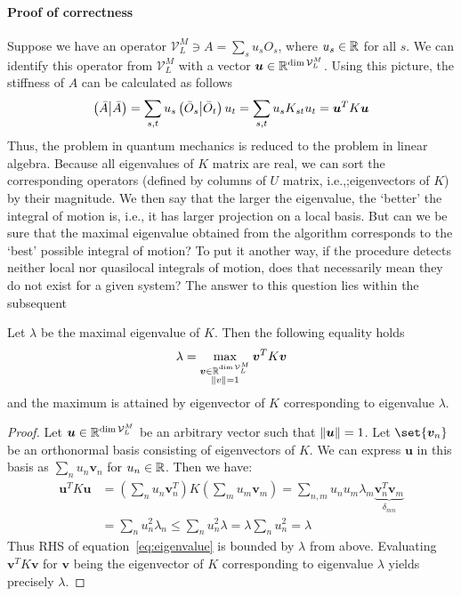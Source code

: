 \paragraph{Proof of correctness}
Suppose we have an operator \(\mathcal{V}_L^M \ni A = \sum_s u_s O_s \), where \(u_s \in \mathbb{R} \) for all \(s\).
We can identify this operator from \(\mathcal{V}_L^M\) with a vector \( \bm{u} \in \mathbb{R}^{\dim{\mathcal{V}_L^M}}\). Using this picture,
the stiffness of \(A\) can be calculated as follows
\begin{equation}
  \left(\bar{A} \middle| \bar{A}\right) = \sum_{s,t} u_s \left(\bar{O}_s \middle| \bar{O}_t\right) u_t = \sum_{s,t} u_s K_{st} u_t = 
   \bm{u}^{T} K \bm{u}  
\end{equation} 
Thus, the problem in quantum mechanics is reduced to the problem in linear algebra.
Because all eigenvalues of \(K\) matrix are real, we can sort the corresponding operators
 (defined by columns of \(U\) matrix, i.e.,;eigenvectors of \(K\)) by their magnitude.
We then say that the larger the eigenvalue, the `better' the integral of motion is, i.e.,
it has larger projection on a local basis.
But can we be sure that the maximal eigenvalue obtained from the algorithm corresponds
to the `best' possible integral of motion? To put it another way, if the procedure detects
neither local nor quasilocal integrals of motion, does that necessarily mean they do not exist
for a given system? The answer to this question lies within the subsequent
\begin{proposition}
Let \(\lambda \) be the maximal eigenvalue of \(K\). Then the following equality holds
\begin{equation}
  \lambda = \max_{  \substack{\bm{v}\in \mathbb{R}^{\dim{\mathcal{V}_L^M}}\\\norm{v} = 1}  }{\bm{v}^{T} K \bm{v}}
  \label{eq:eigenvalue}
\end{equation}
and the maximum is attained by eigenvector of \(K\) corresponding to eigenvalue \(\lambda\).
\label{prop:proof}
\end{proposition}
\begin{proof}
  Let \(\bm{u} \in \mathbb{R}^{\dim{\mathcal{V}_L^M}}\) be an arbitrary vector such that
  \(\norm{\bm{u}} = 1\). Let \(\set{\bm{v}_n}\) be an orthonormal basis consisting
  of eigenvectors of \(K\). We can express \(\bm{u}\) in this basis as
  \(\sum_n u_n \bm{v}_n\) for \(u_n \in \mathbb{R}\). Then we have:
  \begin{align*}    
    \bm{u}^T K \bm{u} &= \left( \sum_n u_n \bm{v}_n^{T} \right) K  \left( \sum_m u_m \bm{v}_m \right) 
    = \sum_{n,m} u_n u_m \lambda_m \underbrace{\bm{v}_n^{T} \bm{v}_m}_{\delta_{mn}} \\
    &= \sum_n u_n^2 \lambda_n \leq \sum_n u_n^2 \lambda = \lambda \sum_n u_n^2 = \lambda   
  \end{align*}
Thus RHS of equation~\eqref{eq:eigenvalue} is bounded by \(\lambda\) from above. Evaluating
 \(\bm{v}^T K \bm{v}\) for \(\bm{v}\) being the eigenvector of \(K\) corresponding
to eigenvalue \(\lambda\) yields precisely \(\lambda\).
\end{proof}

